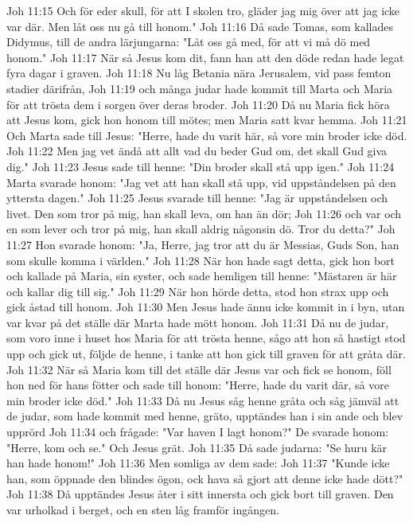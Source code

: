 Joh 11:15  Och för eder skull, för att I skolen tro, gläder jag mig över att jag icke var där. Men låt oss nu gå till honom."
Joh 11:16  Då sade Tomas, som kallades Didymus, till de andra lärjungarna: "Låt oss gå med, för att vi må dö med honom."
Joh 11:17  När så Jesus kom dit, fann han att den döde redan hade legat fyra dagar i graven.
Joh 11:18  Nu låg Betania nära Jerusalem, vid pass femton stadier därifrån,
Joh 11:19  och många judar hade kommit till Marta och Maria för att trösta dem i sorgen över deras broder.
Joh 11:20  Då nu Maria fick höra att Jesus kom, gick hon honom till mötes; men Maria satt kvar hemma.
Joh 11:21  Och Marta sade till Jesus: "Herre, hade du varit här, så vore min broder icke död.
Joh 11:22  Men jag vet ändå att allt vad du beder Gud om, det skall Gud giva dig."
Joh 11:23  Jesus sade till henne: "Din broder skall stå upp igen."
Joh 11:24  Marta svarade honom: "Jag vet att han skall stå upp, vid uppståndelsen på den yttersta dagen."
Joh 11:25  Jesus svarade till henne: "Jag är uppståndelsen och livet. Den som tror på mig, han skall leva, om han än dör;
Joh 11:26  och var och en som lever och tror på mig, han skall aldrig någonsin dö. Tror du detta?"
Joh 11:27  Hon svarade honom: "Ja, Herre, jag tror att du är Messias, Guds Son, han som skulle komma i världen."
Joh 11:28  När hon hade sagt detta, gick hon bort och kallade på Maria, sin syster, och sade hemligen till henne: "Mästaren är här och kallar dig till sig."
Joh 11:29  När hon hörde detta, stod hon strax upp och gick åstad till honom.
Joh 11:30  Men Jesus hade ännu icke kommit in i byn, utan var kvar på det ställe där Marta hade mött honom.
Joh 11:31  Då nu de judar, som voro inne i huset hos Maria för att trösta henne, sågo att hon så hastigt stod upp och gick ut, följde de henne, i tanke att hon gick till graven för att gråta där.
Joh 11:32  När så Maria kom till det ställe där Jesus var och fick se honom, föll hon ned för hans fötter och sade till honom: "Herre, hade du varit där, så vore min broder icke död."
Joh 11:33  Då nu Jesus såg henne gråta och såg jämväl att de judar, som hade kommit med henne, gräto, upptändes han i sin ande och blev upprörd
Joh 11:34  och frågade: "Var haven I lagt honom?" De svarade honom: "Herre, kom och se." Och Jesus grät.
Joh 11:35  Då sade judarna: "Se huru kär han hade honom!"
Joh 11:36  Men somliga av dem sade:
Joh 11:37  "Kunde icke han, som öppnade den blindes ögon, ock hava så gjort att denne icke hade dött?"
Joh 11:38  Då upptändes Jesus åter i sitt innersta och gick bort till graven. Den var urholkad i berget, och en sten låg framför ingången.
